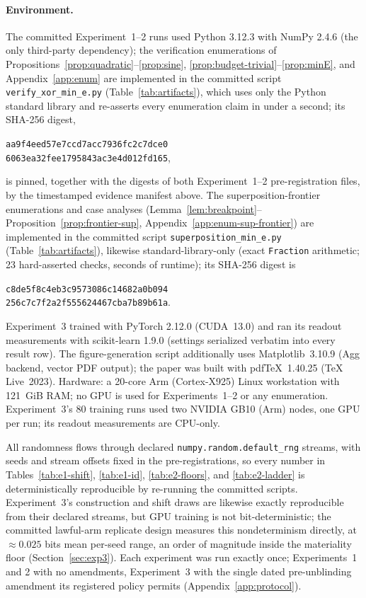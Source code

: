 \documentclass[twocolumn,10pt]{article}
\theoremstyle{definition}
\theoremstyle{remark}
\begin{document}
\paragraph{Environment.} The committed Experiment~1--2 runs used
Py\-thon 3.12.3
with NumPy 2.4.6 (the only third-party dependency); the verification
enumerations of Propositions~\ref{prop:quadratic}--\ref{prop:sine},
\ref{prop:budget-trivial}--\ref{prop:minE}, and Appendix~\ref{app:enum}
are implemented in the committed script
\texttt{verify\_\allowbreak xor\_\allowbreak min\_\allowbreak e.py}
(Table~\ref{tab:artifacts}), which uses only the Python standard
library and re-asserts every enumeration claim in under a second; its
SHA-256 digest,
\begin{center}
\texttt{aa9f4eed57e7ccd7acc7936fc2c7dce0}\\
\texttt{6063ea32fee1795843ac3e4d012fd165},
\end{center}
is pinned, together with the digests of both Experiment~1--2
pre-registration files,
by the timestamped evidence manifest above. The
superposition-frontier enumerations and case analyses
(Lemma~\ref{lem:breakpoint}--Proposition~\ref{prop:frontier-sup},
Appendix~\ref{app:enum-sup-frontier}) are implemented in the committed
script
\texttt{superposition\_\allowbreak min\_\allowbreak e.py}
(Table~\ref{tab:artifacts}), likewise standard-library-only (exact
\texttt{Fraction} arithmetic; 23 hard-asserted checks, seconds of
runtime); its SHA-256 digest is
\begin{center}
\texttt{c8de5f8c4eb3c9573086c14682a0b094}\\
\texttt{256c7c7f2a2f555624467cba7b89b61a}.
\end{center}
Experiment~3 trained with PyTorch 2.12.0 (CUDA~13.0) and ran its
readout measurements with scikit-learn 1.9.0 (settings serialized
verbatim into every result row). The figure-generation
script additionally uses
Matplotlib~3.10.9 (Agg backend, vector PDF output); the paper was built
with pdfTeX~1.40.25 (TeX Live~2023). Hardware: a 20-core Arm (Cortex-X925) Linux workstation with
121~GiB RAM; no GPU is used for Experiments~1--2 or any enumeration.
Experiment~3's 80 training runs used two NVIDIA GB10 (Arm) nodes, one
GPU per run; its readout measurements are CPU-only.

All randomness flows through declared
\texttt{numpy.\allowbreak random.\allowbreak default\_rng} streams,
with seeds and stream offsets
fixed in the pre-registrations, so every number in
Tables~\ref{tab:e1-shift}, \ref{tab:e1-id}, \ref{tab:e2-floors}, and
\ref{tab:e2-ladder} is deterministically
reproducible by re-running the committed scripts. Experiment~3's
construction and shift draws are likewise exactly reproducible from
their declared streams, but GPU training is not bit-deterministic; the
committed lawful-arm replicate design measures this nondeterminism
directly, at $\approx 0.025$ bits mean per-seed range, an order of
magnitude inside the materiality floor (Section~\ref{sec:exp3}). Each
experiment was run
exactly once; Experiments~1 and 2 with no amendments, Experiment~3
with the single dated pre-unblinding amendment its registered policy
permits (Appendix~\ref{app:protocol}).
\end{document}
